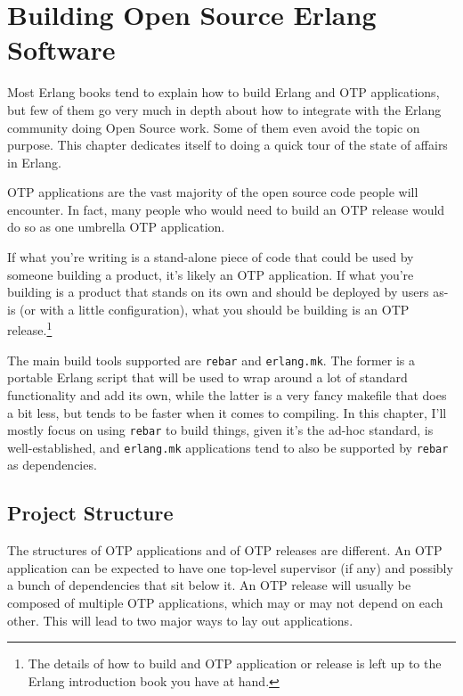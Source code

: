 \documentclass[11pt, oneside]{book}   	%
\newcommand{\app}[1]{\Verb`#1`}
\begin{document}

\chapter{Building Open Source Erlang Software}
\label{chap:building-open-source-erlang-software}

Most Erlang books tend to explain how to build Erlang and OTP applications, but few of them go very much in depth about how to integrate with the Erlang community doing Open Source work. Some of them even avoid the topic on purpose. This chapter dedicates itself to doing a quick tour of the state of affairs in Erlang.

OTP applications are the vast majority of the open source code people will encounter. In fact, many people who would need to build an OTP release would do so as one umbrella OTP application. 

If what you're writing is a stand-alone piece of code that could be used by someone building a product, it's likely an OTP application. If what you're building is a product that stands on its own and should be deployed by users as-is (or with a little configuration), what you should be building is an OTP release.\footnote{The details of how to build and OTP application or release is left up to the Erlang introduction book you have at hand.}

The main build tools supported are \app{rebar} and \app{erlang.mk}. The former is a portable Erlang script that will be used to wrap around a lot of standard functionality and add its own, while the latter is a very fancy makefile that does a bit less, but tends to be faster when it comes to compiling. In this chapter, I'll mostly focus on using \app{rebar} to build things, given it's the ad-hoc standard, is well-established, and \app{erlang.mk} applications tend to also be supported by \app{rebar} as dependencies.

\section{Project Structure}
\label{sec:project-structure}

The structures of OTP applications and of OTP releases are different. An OTP application can be expected to have one top-level supervisor (if any) and possibly a bunch of dependencies that sit below it. An OTP release will usually be composed of multiple OTP applications, which may or may not depend on each other. This will lead to two major ways to lay out applications.
\end{document}
